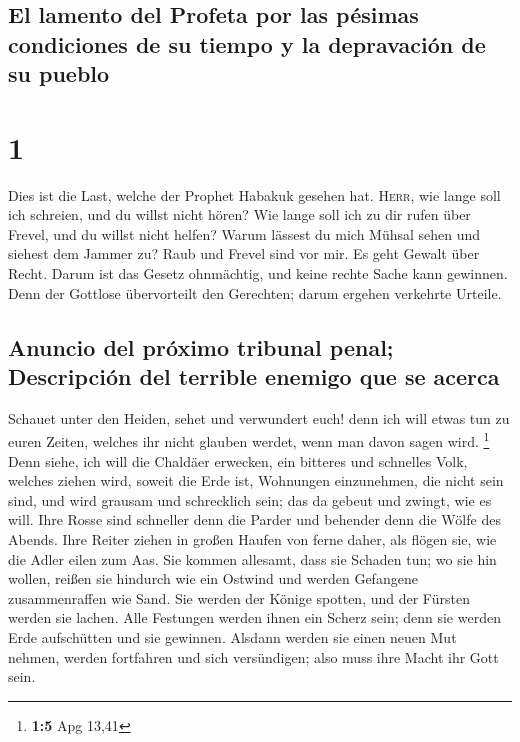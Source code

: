 \hypertarget{el-lamento-del-profeta-por-las-puxe9simas-condiciones-de-su-tiempo-y-la-depravaciuxf3n-de-su-pueblo}{%
\subsection{El lamento del Profeta por las pésimas condiciones de su
tiempo y la depravación de su
pueblo}\label{el-lamento-del-profeta-por-las-puxe9simas-condiciones-de-su-tiempo-y-la-depravaciuxf3n-de-su-pueblo}}

\hypertarget{section}{%
\section{1}\label{section}}

 Dies ist die Last, welche der Prophet Habakuk gesehen
hat.  \textsc{Herr}, wie lange soll ich schreien, und du
willst nicht hören? Wie lange soll ich zu dir rufen über Frevel, und du
willst nicht helfen?  Warum lässest du mich Mühsal sehen
und siehest dem Jammer zu? Raub und Frevel sind vor mir. Es geht Gewalt
über Recht.  Darum ist das Gesetz ohnmächtig, und keine
rechte Sache kann gewinnen. Denn der Gottlose übervorteilt den
Gerechten; darum ergehen verkehrte Urteile.

\hypertarget{anuncio-del-pruxf3ximo-tribunal-penal-descripciuxf3n-del-terrible-enemigo-que-se-acerca}{%
\subsection{Anuncio del próximo tribunal penal; Descripción del terrible
enemigo que se
acerca}\label{anuncio-del-pruxf3ximo-tribunal-penal-descripciuxf3n-del-terrible-enemigo-que-se-acerca}}

 Schauet unter den Heiden, sehet und verwundert euch! denn
ich will etwas tun zu euren Zeiten, welches ihr nicht glauben werdet,
wenn man davon sagen wird. \footnote{\textbf{1:5} Apg 13,41}
 Denn siehe, ich will die Chaldäer erwecken, ein bitteres
und schnelles Volk, welches ziehen wird, soweit die Erde ist, Wohnungen
einzunehmen, die nicht sein sind,  und wird grausam und
schrecklich sein; das da gebeut und zwingt, wie es will. 
Ihre Rosse sind schneller denn die Parder und behender denn die Wölfe
des Abends. Ihre Reiter ziehen in großen Haufen von ferne daher, als
flögen sie, wie die Adler eilen zum Aas.  Sie kommen
allesamt, dass sie Schaden tun; wo sie hin wollen, reißen sie hindurch
wie ein Ostwind und werden Gefangene zusammenraffen wie Sand.
 Sie werden der Könige spotten, und der Fürsten werden
sie lachen. Alle Festungen werden ihnen ein Scherz sein; denn sie werden
Erde aufschütten und sie gewinnen.  Alsdann werden sie
einen neuen Mut nehmen, werden fortfahren und sich versündigen; also
muss ihre Macht ihr Gott sein.


